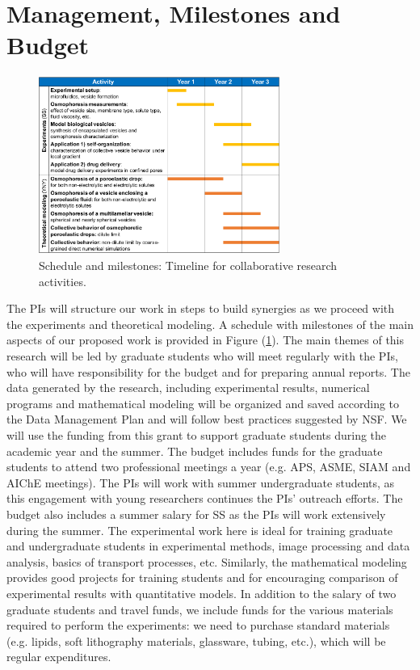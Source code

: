 \documentclass[11pt]{article}
\begin{document}
\section{Management, Milestones and Budget}
\vspace*{-7pt}
\begin{figure}
\vspace*{-15pt}
\centerline{\includegraphics[width=3.1in]{figs/timeline.pdf}}
\vspace*{-8pt}
\caption{\footnotesize Schedule and milestones: Timeline for collaborative research activities.}
\label{fig:ScheduleMilestones}
\end{figure}
%
The PIs will structure our work in steps to build synergies as we proceed with the experiments and theoretical modeling. A schedule with milestones of the main aspects of our proposed work is provided in Figure (\ref{fig:ScheduleMilestones}). The main themes of this research will be led by graduate students who will meet regularly with the PIs, who will have responsibility for the budget and for preparing annual reports. The data generated by the research, including experimental results, numerical programs and mathematical modeling will be organized and saved according to the Data Management Plan and will follow best practices suggested by NSF. We will use the funding from this grant to support graduate students during the academic year and the summer. The budget includes funds for the graduate students to attend two professional meetings a year (e.g. APS, ASME, SIAM and AIChE meetings). 
The PIs will work with summer undergraduate students, as this engagement with young researchers continues the PIs' outreach efforts. The budget also includes a summer salary for SS as the PIs will work extensively during the summer. The experimental work here is ideal for training graduate and undergraduate students in experimental methods, image processing and data analysis, basics of transport processes, etc. Similarly, the mathematical modeling provides good projects for training students and for encouraging comparison of experimental results with quantitative models. In addition to the salary of two graduate students and travel funds, we include funds for the various materials required to perform the experiments: we need to purchase standard materials (e.g. lipids, soft lithography materials, glassware, tubing, etc.), which will be regular expenditures.
\end{document}
